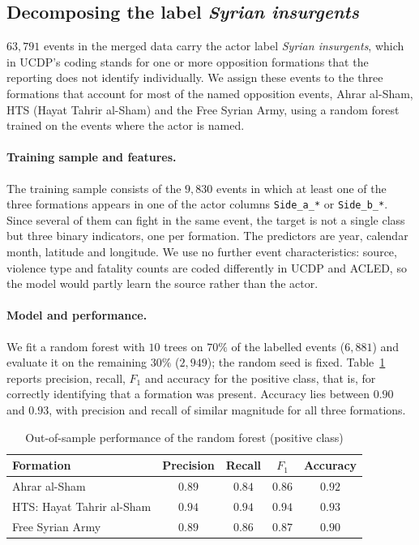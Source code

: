 \subsection{Decomposing the label \emph{Syrian insurgents}}
\label{app:rf}

$63{,}791$ events in the merged data carry the actor label \emph{Syrian
insurgents}, which in UCDP's coding stands for one or more opposition
formations that the reporting does not identify individually. We assign these
events to the three formations that account for most of the named opposition
events, Ahrar al-Sham, HTS (Hayat Tahrir al-Sham) and the Free Syrian Army,
using a random forest trained on the events where the actor is named.

\paragraph{Training sample and features.}
The training sample consists of the $9{,}830$ events in which at least one of the
three formations appears in one of the actor columns \texttt{Side\_a\_*} or
\texttt{Side\_b\_*}. Since several of them can fight in the same event, the
target is not a single class but three binary indicators, one per formation.
The predictors are year, calendar month, latitude and longitude. We use no
further event characteristics: source, violence type and fatality counts are
coded differently in UCDP and ACLED, so the model would partly learn the source
rather than the actor.

\paragraph{Model and performance.}
We fit a random forest with $10$ trees on $70\%$ of the labelled events
($6{,}881$) and evaluate it on the remaining $30\%$ ($2{,}949$); the random seed
is fixed. Table~\ref{tab:rf_performance} reports precision, recall, $F_1$ and
accuracy for the positive class, that is, for correctly identifying that a
formation was present. Accuracy lies between $0.90$ and $0.93$, with precision
and recall of similar magnitude for all three formations.

\begin{table}[htbp]
\centering
\caption{Out-of-sample performance of the random forest (positive class)}
\label{tab:rf_performance}
\begin{tabular}{lcccc}
\hline\hline
Formation & Precision & Recall & $F_1$ & Accuracy \\
\hline
Ahrar al-Sham             & $0.89$ & $0.84$ & $0.86$ & $0.92$ \\
HTS: Hayat Tahrir al-Sham & $0.94$ & $0.94$ & $0.94$ & $0.93$ \\
Free Syrian Army          & $0.89$ & $0.86$ & $0.87$ & $0.90$ \\
\hline\hline
\end{tabular}
\end{table}

